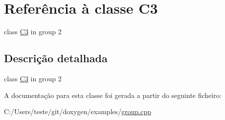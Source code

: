 \hypertarget{class_c3}{\section{Referência à classe C3}
\label{class_c3}
}


class \hyperlink{class_c3}{C3} in group 2  




\subsection{Descrição detalhada}
class \hyperlink{class_c3}{C3} in group 2 

A documentação para esta classe foi gerada a partir do seguinte ficheiro\-:\begin{DoxyCompactItemize}
\item 
C\-:/\-Users/teste/git/doxygen/examples/\hyperlink{group_8cpp}{group.\-cpp}\end{DoxyCompactItemize}
